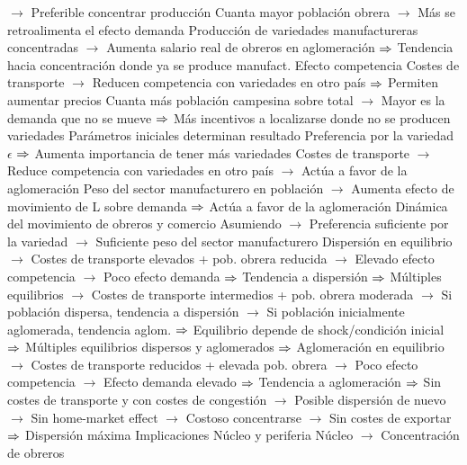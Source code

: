 \documentclass{nuevotema}
\begin{document}
\begin{esquemal}
				\4[] $\to$ Preferible concentrar producción
				\4[] Cuanta mayor población obrera
				\4[] $\to$ Más se retroalimenta el efecto demanda
				\4[] Producción de variedades manufactureras concentradas
				\4[] $\to$ Aumenta salario real de obreros en aglomeración
				\4[] $\Rightarrow$ Tendencia hacia concentración donde ya se produce manufact.
				\4 Efecto competencia
				\4[] Costes de transporte
				\4[] $\to$ Reducen competencia con variedades en otro país
				\4[] $\Rightarrow$ Permiten aumentar precios
				\4[] Cuanta más población campesina sobre total
				\4[] $\to$ Mayor es la demanda que no se mueve
				\4[] $\Rightarrow$ Más incentivos a localizarse donde no se producen variedades
				\4 Parámetros iniciales determinan resultado
				\4[] Preferencia por la variedad $\epsilon$
				\4[] $\Rightarrow$ Aumenta importancia de tener más variedades
				\4[] Costes de transporte
				\4[] $\to$ Reduce competencia con variedades en otro país
				\4[] $\to$ Actúa a favor de la aglomeración
				\4[] Peso del sector manufacturero en población
				\4[] $\to$ Aumenta efecto de movimiento de L sobre demanda
				\4[] $\Rightarrow$ Actúa a favor de la aglomeración
				\4 Dinámica del movimiento de obreros y comercio
				\4[] Asumiendo
				\4[] $\to$ Preferencia suficiente por la variedad
				\4[] $\to$ Suficiente peso del sector manufacturero
				\4[] Dispersión en equilibrio
				\4[] $\to$ Costes de transporte elevados +  pob. obrera reducida
				\4[] $\to$ Elevado efecto competencia
				\4[] $\to$ Poco efecto demanda
				\4[] $\Rightarrow$ Tendencia a dispersión
				\4[] $\Rightarrow$ 
				\4[] Múltiples equilibrios
				\4[] $\to$ Costes de transporte intermedios + pob. obrera moderada
				\4[] $\to$ Si población dispersa, tendencia a dispersión
				\4[] $\to$ Si población inicialmente aglomerada, tendencia aglom.
				\4[] $\Rightarrow$ Equilibrio depende de shock/condición inicial
				\4[] $\Rightarrow$ Múltiples equilibrios dispersos y aglomerados
				\4[] $\Rightarrow$ 
				\4[] Aglomeración en equilibrio
				\4[] $\to$ Costes de transporte reducidos + elevada pob. obrera
				\4[] $\to$ Poco efecto competencia
				\4[] $\to$ Efecto demanda elevado
				\4[] $\Rightarrow$ Tendencia a aglomeración
				\4[] $\Rightarrow$ 
				\4[] Sin costes de transporte y con costes de congestión
				\4[] $\to$ Posible dispersión de nuevo
				\4[] $\to$ Sin home-market effect
				\4[] $\to$ Costoso concentrarse
				\4[] $\to$ Sin costes de exportar
				\4[] $\Rightarrow$ Dispersión máxima
			\3 Implicaciones
				\4 Núcleo y periferia
				\4[] Núcleo
				\4[] $\to$ Concentración de obreros

\end{esquemal}
\end{document}
